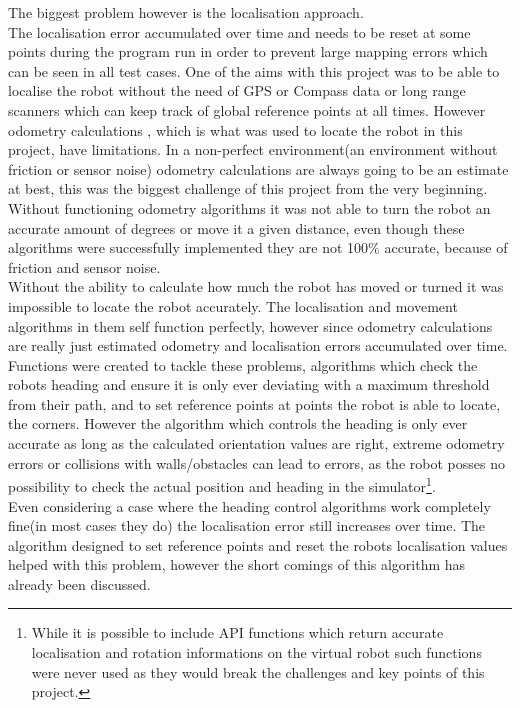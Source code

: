 The biggest problem however is the localisation approach. \\
The localisation error accumulated over time and needs to be reset at some points during the program run in order to prevent large mapping errors which can be seen in all test cases. One of the aims with this project was to be able to localise the robot without the need of GPS or Compass data or long range scanners which can keep track of global reference points at all times. However odometry calculations , which is what was used to locate the robot in this project, have limitations. In a non-perfect environment(an environment without friction or sensor noise) odometry calculations are always going to be an estimate at best, this was the biggest challenge of this project from the very beginning. Without functioning odometry algorithms it was not able to turn the robot an accurate amount of degrees or move it a given distance, even though these algorithms were successfully implemented they are not 100\% accurate, because of friction and sensor noise. \\[3ex]

Without the ability to calculate how much the robot has moved or turned it was impossible to locate the robot accurately. 
The localisation and movement algorithms in them self function perfectly, however since odometry calculations are really just estimated odometry and localisation errors accumulated over time. Functions were created to tackle these problems, algorithms which check the robots heading and ensure it is only ever deviating with a maximum threshold from their path, and to set reference points at points the robot is able to locate, the corners. However the algorithm which controls the heading is only ever accurate as long as the calculated orientation values are right, extreme odometry errors or collisions with walls/obstacles can lead to errors, as the robot posses no possibility to check the actual position and heading in the simulator\footnote{While it is possible to include API functions which return accurate localisation and rotation informations on the virtual robot such functions were never used as they would break the challenges and key points of this project.}.\\
Even considering a case where the heading control algorithms work completely fine(in most cases they do) the localisation error still increases over time. The algorithm designed to set reference points and reset the robots localisation values helped with this problem, however the short comings of this algorithm has already been discussed. \\[3ex]

